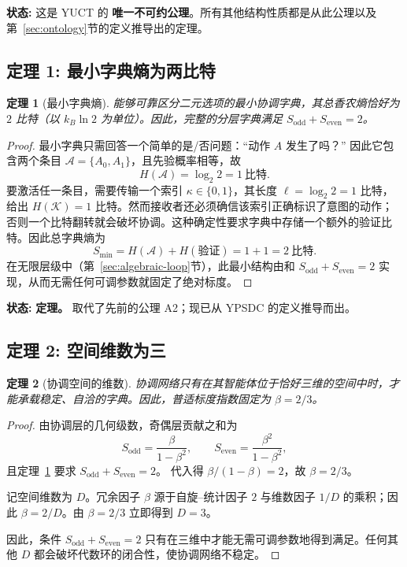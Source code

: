 \documentclass[12pt,a4paper]{article}
\newtheorem{theorem}{定理}[section]
\begin{document}
	\textbf{状态:} 这是 YUCT 的 \textbf{唯一不可约公理}。所有其他结构性质都是从此公理以及第~\ref{sec:ontology}节的定义推导出的定理。
	
	\subsection{定理 1: 最小字典熵为两比特}
	
	\begin{theorem}[最小字典熵]
		\label{thm:minimal-dict}
		能够可靠区分二元选项的最小协调字典，其总香农熵恰好为 \(2\) 比特（以 \(k_B\ln 2\) 为单位）。因此，完整的分层字典满足 \(S_{\mathrm{odd}} + S_{\mathrm{even}} = 2\)。
	\end{theorem}
	
	\begin{proof}
		最小字典只需回答一个简单的是/否问题：“动作 \(A\) 发生了吗？” 因此它包含两个条目 \(\mathcal{A} = \{A_0, A_1\}\)，且先验概率相等，故
		\[
		H(\mathcal{A}) = \log_2 2 = 1\ \text{比特}.
		\]
		要激活任一条目，需要传输一个索引 \(\kappa \in \{0,1\}\)，其长度 \(\ell = \log_2 2 = 1\) 比特，给出 \(H(\mathcal{K}) = 1\) 比特。然而接收者还必须确信该索引正确标识了意图的动作；否则一个比特翻转就会破坏协调。这种确定性要求字典中存储一个额外的验证比特。因此总字典熵为
		\[
		S_{\min} = H(\mathcal{A}) + H(\text{验证}) = 1 + 1 = 2\ \text{比特}.
		\]
		在无限层级中（第~\ref{sec:algebraic-loop}节），此最小结构由和 \(S_{\mathrm{odd}} + S_{\mathrm{even}} = 2\) 实现，从而无需任何可调参数就固定了绝对标度。
	\end{proof}
	
	\textbf{状态:} \textbf{定理。} 取代了先前的公理 A2；现已从 YPSDC 的定义推导而出。
	
	\subsection{定理 2: 空间维数为三}
	
	\begin{theorem}[协调空间的维数]
		\label{thm:dimension}
		协调网络只有在其智能体位于恰好三维的空间中时，才能承载稳定、自洽的字典。因此，普适标度指数固定为 \(\beta = 2/3\)。
	\end{theorem}
	
	\begin{proof}
		由协调层的几何级数，奇偶层贡献之和为
		\[
		S_{\mathrm{odd}} = \frac{\beta}{1-\beta^2}, \qquad
		S_{\mathrm{even}} = \frac{\beta^2}{1-\beta^2},
		\]
		且定理~\ref{thm:minimal-dict} 要求 \(S_{\mathrm{odd}} + S_{\mathrm{even}} = 2\)。
		代入得 \(\beta/(1-\beta) = 2\)，故 \(\beta = 2/3\)。
		
		记空间维数为 \(D\)。冗余因子 \(\beta\) 源于自旋–统计因子 \(2\) 与维数因子 \(1/D\) 的乘积；因此 \(\beta = 2/D\)。由 \(\beta = 2/3\) 立即得到 \(D = 3\)。
		
		因此，条件 \(S_{\mathrm{odd}} + S_{\mathrm{even}} = 2\) 只有在三维中才能无需可调参数地得到满足。任何其他 \(D\) 都会破坏代数环的闭合性，使协调网络不稳定。
	\end{proof}
	
\end{document}
